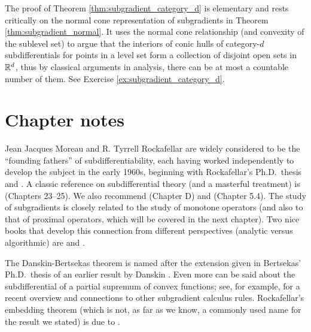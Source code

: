 
The proof of Theorem \ref{thm:subgradient_category_d} is elementary and 
rests critically on the normal cone representation of subgradients in Theorem 
\ref{thm:subgradient_normal}. It uses the normal cone relationship (and
convexity of the sublevel set) to argue that the interiors of conic hulls of
category-$d$ subdifferentials for points in a level set form a collection of 
disjoint open sets in $\mathbb{R}^d$, thus by classical arguments in analysis, there
can be at most a countable number of them. See Exercise
\ref{ex:subgradient_category_d}.       

\SkipTocEntry\section*{Chapter notes}

Jean Jacques Moreau and R. Tyrrell Rockafellar are widely considered to be the
``founding fathers'' of subdifferentiability, each having worked independently
to develop the subject in the early 1960s, beginning with Rockafellar's Ph.D.\
thesis \cite{rockafellar1963convex} and \cite{moreau1963inf,
  moreau1963proprietes}. A classic reference on subdifferential theory (and a 
masterful treatment) is \cite{rockafellar1970convex} (Chapters 23--25). We also
recommend \cite{hiriartUrruty2001fundamentals} (Chapter D) and
\cite{bertsekas2009convex} (Chapter 5.4). The study of subgradients is closely
related to the study of monotone operators (and also to that of proximal
operators, which will be covered in the next chapter). Two nice books that
develop this connection from different perspectives (analytic versus
algorithmic) are \cite{bauschke2011convex} and \cite{ryu2022large}.

The Danskin-Bertsekas theorem is named after the extension given in Bertsekas'
Ph.D.\ thesis \cite{bertsekas1971control} of an earlier result by Danskin
\cite{danskin1967theory}. Even more can be said about the subdifferential of a
partial supremum of convex functions; see, for example,
\cite{hantoute2008subdifferential} for a recent overview and connections to
other subgradient calculus rules. Rockafellar's embedding theorem (which is not, 
as far as we know, a commonly used name for the result we stated) is due to
\cite{rockafellar1966characterization}.  

